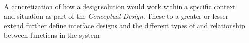 \begin{tool} \label{tool:concrete_scenario} 
  A concretization of how a designsolution would work within a specific context and situation as part of the \emph{Conceptual Design}. These to a greater or lesser extend further define interface designs and the different types of and relationship between functions in the system. \cite[p. 64]{benyon_14}
\end{tool}